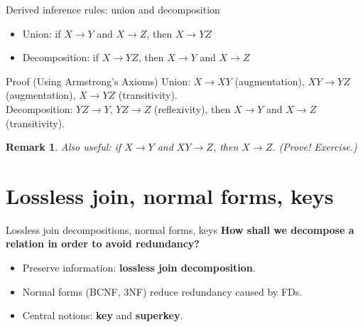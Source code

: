 \documentclass[10pt,aspectratio=169]{beamer}
\newtheorem{remark}{Remark}
\newenvironment{examplebox}[1][Example]{\begin{exampleblock}{#1}}{\end{exampleblock}}
\begin{document}
\begin{frame}{Derived inference rules: union and decomposition}
\begin{theorem}
\begin{itemize}
  \item Union: if \(X \rightarrow Y\) and \(X \rightarrow Z\), then \(X \rightarrow YZ\)
  \item Decomposition: if \(X \rightarrow YZ\), then \(X \rightarrow Y\) and \(X \rightarrow Z\)
\end{itemize}
\end{theorem}

\begin{examplebox}[Proof (Using Armstrong's Axioms)]
\small
Union: \(X \rightarrow XY\) (augmentation), \(XY \rightarrow YZ\) (augmentation), \(X \rightarrow YZ\) (transitivity).\\
Decomposition: \(YZ \rightarrow Y\), \(YZ \rightarrow Z\) (reflexivity), then \(X \rightarrow Y\) and \(X \rightarrow Z\) (transitivity).
\end{examplebox}

\begin{remark}
Also useful: if \(X \rightarrow Y\) and \(XY \rightarrow Z\), then \(X \rightarrow Z\). (Prove! Exercise.)
\end{remark}
\end{frame}

\section{Lossless join, normal forms, keys}

\begin{frame}{Lossless join decompositions, normal forms, keys}
\centering\textbf{How shall we decompose a relation in order to avoid redundancy?}
\vspace{0.5em}
\begin{itemize}
  \item Preserve information: \textbf{lossless join decomposition}.
  \item Normal forms (BCNF, 3NF) reduce redundancy caused by FDs.
  \item Central notions: \textbf{key} and \textbf{superkey}.
\end{itemize}
\end{frame}
\end{document}
